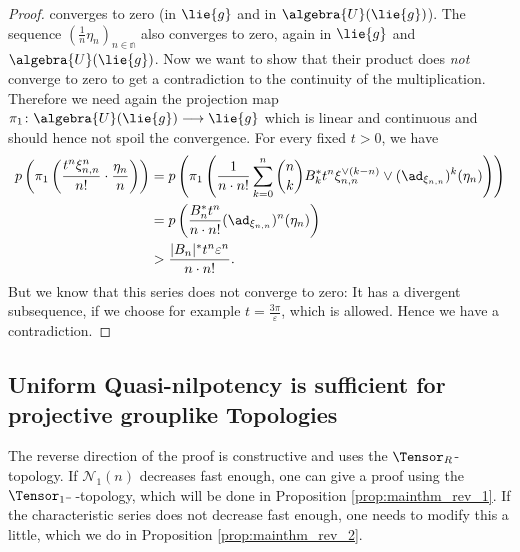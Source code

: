 \documentclass[
11pt,                          %
english                        %
]{article}
\begin{document}
\begin{proof}
	converges to zero (in $\lie{g}$ and in $\algebra{U}(\lie{g})$). The sequence 
	$(\frac{1}{n} \eta_n)_{n \in \mathbb{n}}$ also converges to zero, again in 
	$\lie{g}$ and $\algebra{U}(\lie{g})$.
	Now we want to show that their product does \emph{not} converge to zero
	to get a contradiction to the continuity of the multiplication. Therefore
	we need again the projection map $\pi_1 \colon \algebra{U}(\lie{g}) 
	\longrightarrow \lie{g}$ which is linear and continuous and should hence not 
	spoil the convergence. For every fixed $t > 0$, we have
	\begin{align*}
		p \left(
			\pi_1\left(
				\frac{t^n \xi_{n,n}^n}{n!}
				\cdot
				\frac{\eta_n}{n}
			\right)
		\right)
		&=
		p\left(
			\pi_1 \left(
				\frac{1}{n \cdot n!}
				\sum\limits_{k=0}^n
				\binom{n}{k}
				B_k^* t^n
				\xi_{n,n}^{\vee(k-n)}
				\vee
				(\ad_{\xi_{n,n}})^k(\eta_n)
			\right)
		\right)
		\\
		& =
		p\left(
			\frac{B_n^* t^n}{n \cdot n!}
			(\ad_{\xi_{n,n}})^n(\eta_n)
		\right)
		\\
		& >
		\frac{|B_n|^* t^n \varepsilon^n}{n \cdot n!}.
	\end{align*}
	But we know that this series does not converge to zero: It has a divergent 
	subsequence, if we choose for example $t = \frac{3 \pi}{\varepsilon}$, which is 
	allowed. Hence we have a contradiction.
\end{proof}


\subsection{Uniform Quasi-nilpotency is sufficient for projective grouplike 
Topologies}

The reverse direction of the proof is constructive and uses the 
$\Tensor_R$-topology. If $\mathcal{N}_1(n)$ decreases fast enough, one can
give a proof using the $\Tensor_{1^-}$-topology, which will be done in Proposition
\ref{prop:mainthm_rev_1}. If the characteristic series does not decrease fast 
enough, one needs to modify this a little, which we do in Proposition
\ref{prop:mainthm_rev_2}.
\end{document}
